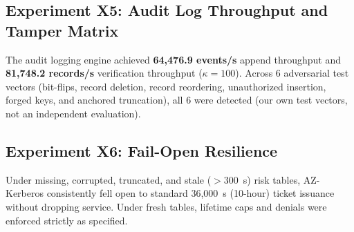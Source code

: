 \documentclass[conference]{IEEEtran}
\begin{document}
\begin{table}[htbp]
\caption{Illustrative lookup latency vs. one in-line model call (C hash lookup vs. Python/sklearn on a synthetic 10-feature input; not a like-for-like comparison)}
\label{tab:microbench}
\centering
{}
\end{table}

\subsection{Experiment X5: Audit Log Throughput and Tamper Matrix}
The audit logging engine achieved \textbf{64,476.9 events/s} append throughput and \textbf{81,748.2 records/s} verification throughput ($\kappa = 100$). Across 6 adversarial test vectors (bit-flips, record deletion, record reordering, unauthorized insertion, forged keys, and anchored truncation), all 6 were detected (our own test vectors, not an independent evaluation).

\subsection{Experiment X6: Fail-Open Resilience}
Under missing, corrupted, truncated, and stale ($>300$~s) risk tables, AZ-Kerberos consistently fell open to standard 36,000~s (10-hour) ticket issuance without dropping service. Under fresh tables, lifetime caps and denials were enforced strictly as specified.
\end{document}
